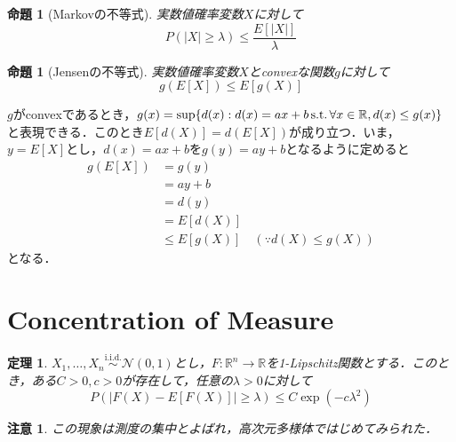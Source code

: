 \documentclass{ltjsarticle}
\makeatletter
\theoremstyle{mystyle1}
\newtheorem{thm}[dfn]{定理}
\newtheorem{prop}[dfn]{命題}
\theoremstyle{mystyle2}
\newtheorem{note*}{注意}
\theoremstyle{mystyle3}
\renewenvironment{proof}[1][\proofname]{\par
  \pushQED{\qed}%
  \normalfont
  \topsep6\p@\@plus6\p@ \trivlist
  \item[\hskip\labelsep{\bfseries\sffamily #1}]\ignorespaces
}{%
  \popQED\endtrivlist\@endpefalse
}
\renewcommand\proofname{証明}
\makeatother
\begin{document}
\begin{prop}[Markovの不等式]
    実数値確率変数$X$に対して
    \begin{equation}
        P(|X|\geq \lambda)\leq\frac{E[|X|]}{\lambda}
    \end{equation}
\end{prop}

\begin{prop}[Jensenの不等式]
    実数値確率変数$X$とconvexな関数$g$に対して
    \begin{equation}
        g(E[X])\leq E[g(X)]
    \end{equation}
\end{prop}

\begin{proof}
    $g$がconvexであるとき，$g(x)=\sup\{d(x):d(x)=ax+b \textrm{\,s.t.\,}\forall x\in\mathbb{R},d(x)\leq g(x)\}$と表現できる．このとき$E[d(X)]=d(E[X])$が成り立つ．いま，$y=E[X]$とし，$d(x)=ax+b$を$g(y)=ay+b$となるように定めると
    \begin{equation}
        \begin{split}
            g(E[X])
            &=g(y)\\
            &=ay+b\\
            &=d(y)\\
            &=E[d(X)]\\
            &\leq E[g(X)]\quad(\because d(X)\leq g(X))
        \end{split}
    \end{equation}
    となる．
\end{proof}

\section{Concentration of Measure}

\begin{thm}
    $X_1,\ldots,X_n\overset{\mathrm{i.i.d.}}{\sim}\mathcal{N}(0,1)$とし，$F:\mathbb{R}^n\to\mathbb{R}$を1-Lipschitz関数とする．このとき，ある$C>0,c>0$が存在して，任意の$\lambda>0$に対して
    \begin{equation}
        P(|F(X)-E[F(X)]|\geq\lambda)\leq C\exp(-c\lambda^2)
    \end{equation}
\end{thm}

\begin{note*}
    この現象は測度の集中とよばれ，高次元多様体ではじめてみられた．
\end{note*}
\end{document}
